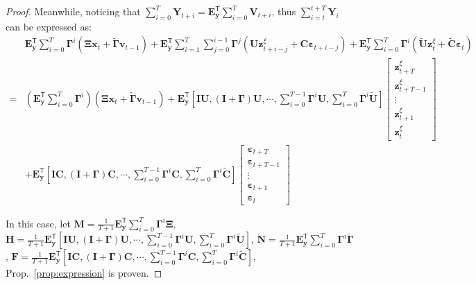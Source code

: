 \documentclass{article}
\theoremstyle{plain}
\theoremstyle{definition}
\theoremstyle{remark}
\def \prop {Prop.}
\def \x {\mathbf{x}}
\def \E {\mathbf{E}}
\def \V {\mathbf{V}}
\def \N {\mathbf{N}}
\def \Y {\mathbf{Y}}
\def \I {\mathbf{I}}
\def \U {\mathbf{U}}
\def \M {\mathbf{M}}
\def \H {\mathbf{H}}
\def \V {\mathbf{V}}
\def \F {\mathbf{F}}
\def \C {\mathbf{C}}
\def \v {\mathbf{v}}
\def \y {\mathbf{y}}
\def \z {\mathbf{z}}
\begin{document}
\begin{proof}
  
 Meanwhile, noticing that \(\sum_{i=0}^T \Y_{t+i} 
  = \E_\y^\mathsf{T}\sum_{i=0}^T \V_{t+i}\), thus \(\sum_{i=t}^{t+T} \Y_{i}\) can be expressed as:
\begin{equation}
  \label{eq:computation}
  \begin{aligned}
    & \E_\y^\mathsf{T}\sum_{i=0}^T \bm{\Gamma}^{i}\left(\bm{\Xi}\x_t + \tilde{\bm{\Gamma}}\v_{t-1}\right) 
    + \E_\y^\mathsf{T}
    \sum_{i=1}^T\sum_{j=0}^{i-1}\bm{\Gamma}^{j} \left(\U\z^\xi_{t+i-j}+\C\bm{\varepsilon}_{t+i-j}\right) 
    + \E_\y^\mathsf{T} \sum_{i=0}^T \bm{\Gamma}^i \left(\tilde{\U}\z^\xi_{t}+\tilde{\C}\bm{\varepsilon}_{t}\right)
    \\
    =& \left(\E_\y^\mathsf{T}\sum\limits_{i=0}^T \bm{\Gamma}^{i}\right)\left(\bm{\Xi}\x_t + \tilde{\bm{\Gamma}}\v_{t-1}\right)
     + \E_\y^\mathsf{T} \left[
      \I\U, (\I+\bm{\Gamma})\U, \cdots, \sum\limits_{i=0}^{T-1}\bm{\Gamma}^i \U, \sum\limits_{i=0}^T\bm{\Gamma}^i \tilde{\U}
      \right]
     \begin{bmatrix}
      \z^\xi_{t+T}\\ \z^\xi_{t+T-1}\\ \vdots \\ \z^\xi_{t+1} \\ \z^\xi_{t}
    \end{bmatrix}\\
    & + \E_\y^\mathsf{T} \left[
      \I\C, (\I+\bm{\Gamma})\C, \cdots, \sum\limits_{i=0}^{T-1}\bm{\Gamma}^i \C, \sum\limits_{i=0}^T\bm{\Gamma}^i \tilde{\C}
      \right]
     \begin{bmatrix}
      \bm{\varepsilon}_{t+T}\\ \bm{\varepsilon}_{t+T-1}\\ \vdots \\ \bm{\varepsilon}_{t+1} \\ \bm{\varepsilon}_{t}
    \end{bmatrix}
  \end{aligned}
\end{equation}

In this case, let \(\M = \frac{1}{T+1}\E_\y^\mathsf{T}\sum\limits_{i=0}^T \bm{\Gamma}^{i}\bm{\Xi}\), 
\(\H = \frac{1}{T+1}\E_\y^\mathsf{T} \left[
  \I\U, (\I+\bm{\Gamma})\U, \cdots, \sum\limits_{i=0}^{T-1}\bm{\Gamma}^i \U, \sum\limits_{i=0}^T\bm{\Gamma}^i \tilde{\U}
  \right]\), 
  \(\N = \frac{1}{T+1}\E_\y^\mathsf{T}\sum\limits_{i=0}^T \bm{\Gamma}^{i}\tilde{\bm{\Gamma}}\), \(\F = \frac{1}{T+1}\E_\y^\mathsf{T} \left[
  \I\C, (\I+\bm{\Gamma})\C, \cdots, \sum\limits_{i=0}^{T-1}\bm{\Gamma}^i \C, \sum\limits_{i=0}^T\bm{\Gamma}^i \tilde{\C}
  \right]\), \prop~\ref{prop:expression} is proven.
\end{proof}
\end{document}
